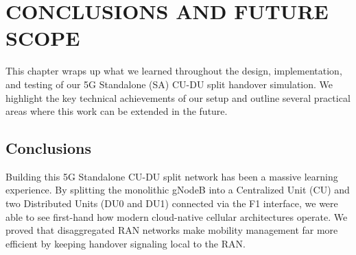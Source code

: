 \chapter{CONCLUSIONS AND FUTURE SCOPE}

\justify
This chapter wraps up what we learned throughout the design, implementation, and testing of our 5G Standalone (SA) CU-DU split handover simulation. We highlight the key technical achievements of our setup and outline several practical areas where this work can be extended in the future.

\section{Conclusions}
\justify
Building this 5G Standalone CU-DU split network has been a massive learning experience. By splitting the monolithic gNodeB into a Centralized Unit (CU) and two Distributed Units (DU0 and DU1) connected via the F1 interface, we were able to see first-hand how modern cloud-native cellular architectures operate. We proved that disaggregated RAN networks make mobility management far more efficient by keeping handover signaling local to the RAN.

